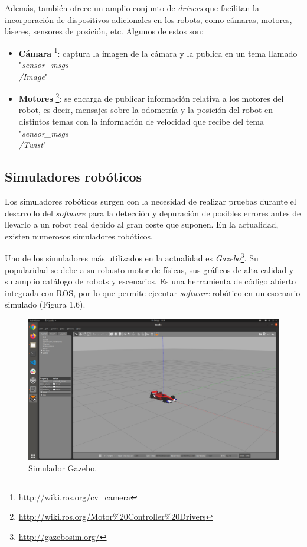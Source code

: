 \documentclass[a4paper, 12pt]{book}
\begin{document}
Además, también ofrece un amplio conjunto de \emph{drivers} que facilitan la incorporación de dispositivos adicionales en los robots, como cámaras, motores, láseres, sensores de posición, etc. Algunos de estos son:

\begin{itemize}
\itemsep 0em
\item \textbf{Cámara} \footnote{\url{http://wiki.ros.org/cv_camera}}: captura la imagen de la cámara y la publica en un tema llamado "\emph{sensor\_msgs\\/Image}"
\item \textbf{Motores} \footnote{\url{http://wiki.ros.org/Motor\%20Controller\%20Drivers}}: se encarga de publicar información relativa a los motores del robot, es decir, mensajes sobre la odometría y la posición del robot en distintos temas con la información de velocidad que recibe del tema "\emph{sensor\_msgs\\/Twist}"

\end{itemize}

\subsection{Simuladores robóticos}
\label{subsec:simuladores}

Los simuladores robóticos surgen con la necesidad de realizar pruebas durante el desarrollo del \textit{software} para la detección y depuración de posibles errores antes de llevarlo a un robot real debido al gran coste que suponen. En la actualidad, existen numerosos simuladores robóticos.

Uno de los simuladores más utilizados en la actualidad es \textit{Gazebo}\footnote{\url{http://gazebosim.org/}}. Su popularidad se debe a su robusto motor de físicas, sus gráficos de alta calidad y su amplio catálogo de robots y escenarios. Es una herramienta de código abierto integrada con ROS, por lo que permite ejecutar \textit{software} robótico en un escenario simulado (Figura 1.6).

\begin{figure}[H]
	\centering
    \includegraphics[width=\textwidth]{img/gazebo}
    \caption{Simulador Gazebo.}
    \label{figura:simulador_gazebo}
\end{figure}
\end{document}
